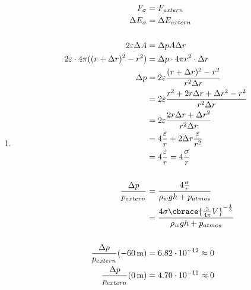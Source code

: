\documentclass[11pt,letterpaper]{article}
\begin{document}
\begin{enumerate}
\begin{enumerate}
      \item
        \begin{align*}
          F_\sigma &= F_{extern}\\
          \Delta E_{\sigma} &= \Delta E_{extern}\\
          \\
          2\varepsilon \Delta A &= \Delta p A \Delta r \\
          2\varepsilon \cdot 4\pi((r+\Delta r)^2-r^2) &= \Delta p\cdot 4\pi r^2 \cdot \Delta r \\
          \Delta p &= 2\varepsilon \frac{(r+\Delta r)^2-r^2}{ r^2 \Delta r} \\
          &= 2\varepsilon \frac{r^2+2r\Delta r+\Delta r^2-r^2}{ r^2 \Delta r} \\
          &= 2\varepsilon \frac{2r\Delta r+\Delta r^2}{ r^2 \Delta r} \\
          &= 4\frac{\varepsilon}{r} +2\Delta r \frac{\varepsilon}{r^2}\\
          &= 4\frac{\varepsilon}{r} = 4\frac{\sigma}{r} \\
          \\
          \frac{\Delta p}{p_{extern}} &= \frac{4\frac{\sigma}{r}}{\rho_w g h + p_{atmos}}\\
          &= \frac{4\sigma\cbrace{\frac{3}{4 \pi}V}^{-\frac{1}{3}}}{\rho_w g h + p_{atmos}}\\
          \\
          \frac{\Delta p}{p_{extern}}(-60\,\mathrm{m}) &= 6.82\cdot 10^{-12} \approx 0\\
          \frac{\Delta p}{p_{extern}}(0\,\mathrm{m}) &= 4.70\cdot 10^{-11} \approx 0\\
        \end{align*}
    \end{enumerate}

\end{enumerate}
\end{document}
